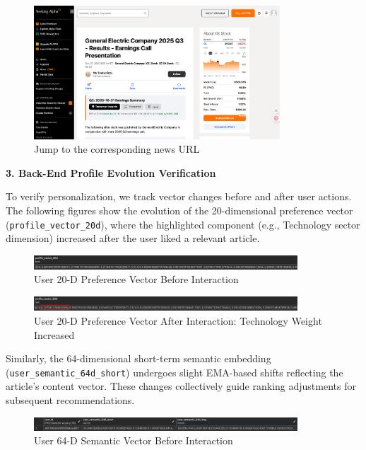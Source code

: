 \begin{figure}[H]
  \centering
  \includegraphics[width=0.82\textwidth]{images/news/clk2.png}
  \caption{Jump to the corresponding news URL}
  \label{fig:clk2}
\end{figure}

\textbf{3. Back-End Profile Evolution Verification}

To verify personalization, we track vector changes before and after user actions. The following figures show the evolution of the 20-dimensional preference vector (\texttt{profile\_vector\_20d}), where the highlighted component (e.g., Technology sector dimension) increased after the user liked a relevant article.

\begin{figure}[H]
  \centering
  \includegraphics[width=0.88\textwidth]{images/news/20d1.png}
  \caption{User 20-D Preference Vector Before Interaction}
  \label{fig:20d1}
\end{figure}

\begin{figure}[H]
  \centering
  \includegraphics[width=0.88\textwidth]{images/news/20d2.png}
  \caption{User 20-D Preference Vector After Interaction: Technology Weight Increased}
  \label{fig:20d2}
\end{figure}

Similarly, the 64-dimensional short-term semantic embedding (\texttt{user\_semantic\_64d\_short}) undergoes slight EMA-based shifts reflecting the article’s content vector. These changes collectively guide ranking adjustments for subsequent recommendations.

\begin{figure}[H]
  \centering
  \includegraphics[width=0.88\textwidth]{images/news/64d1.png}
  \caption{User 64-D Semantic Vector Before Interaction}
  \label{fig:64d1}
\end{figure}


